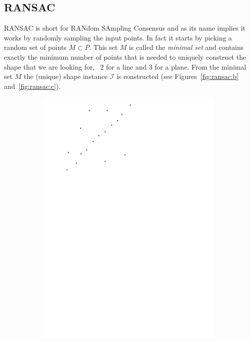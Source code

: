 \subsection{RANSAC}

RANSAC is short for RANdom SAmpling Consensus and as its name implies it works by randomly sampling the input points.
In fact it starts by picking a random set of points $M \subset P$. 
This set $M$ is called the \emph{minimal set} and contains exactly the minimum number of points that is needed to uniquely construct the shape that we are looking for, \eg\ 2 for a line and 3 for a plane. 
From the minimal set $M$ the (unique) shape instance $\mathcal{I}$ is constructed (see Figures~\ref{fig:ransac:b} and~\ref{fig:ransac:c}).
\begin{figure}
	\centering
	\begin{subfigure}[b]{0.24\linewidth}
		\centering
		\includegraphics[width=\textwidth,page=1]{figs/ransac.pdf}

\end{subfigure}
\end{figure}
